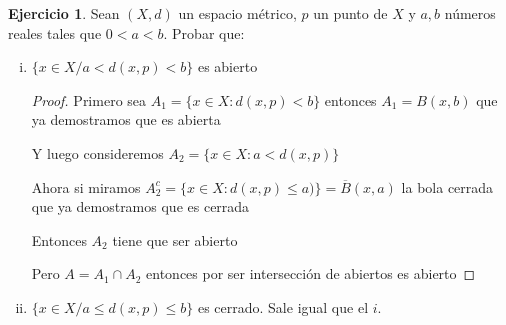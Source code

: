 \documentclass[12pt]{report}
\newcommand{\ol}{\overline}
\theoremstyle{definition}
\newtheorem{ej}{Ejercicio}
\begin{document}
\begin{ej}
	Sean $(X,d)$ un espacio métrico, $p$ un punto de $X$ y $a,b$ números reales tales que $0 <a<b$. Probar que:
	\begin{enumerate}[i.]
		\item $ \{ x \in X \text{/} a < d(x,p)<b\}$ es abierto
			\begin{proof}
				Primero sea $A_1 = \{x \in X : d(x,p) < b\}$ entonces $A_1 = B(x,b)$ que ya demostramos que es abierta

				Y luego consideremos $A_2 = \{x \in X : a < d(x,p)\}$

				Ahora si miramos $A_2^c = \{x \in X : d(x,p) \leq a)\} = \ol B (x,a)$ la bola cerrada que ya demostramos que es cerrada

				Entonces $A_2$ tiene que ser abierto

				Pero $A = A_1 \cap A_2$ entonces por ser intersección de abiertos es abierto
			\end{proof}
			
		\item $ \{ x \in X \text{/} a \leq d(x,p) \leq b\}$ es cerrado. Sale igual que el $i.$
	\end{enumerate}
\end{ej}
\end{document}
